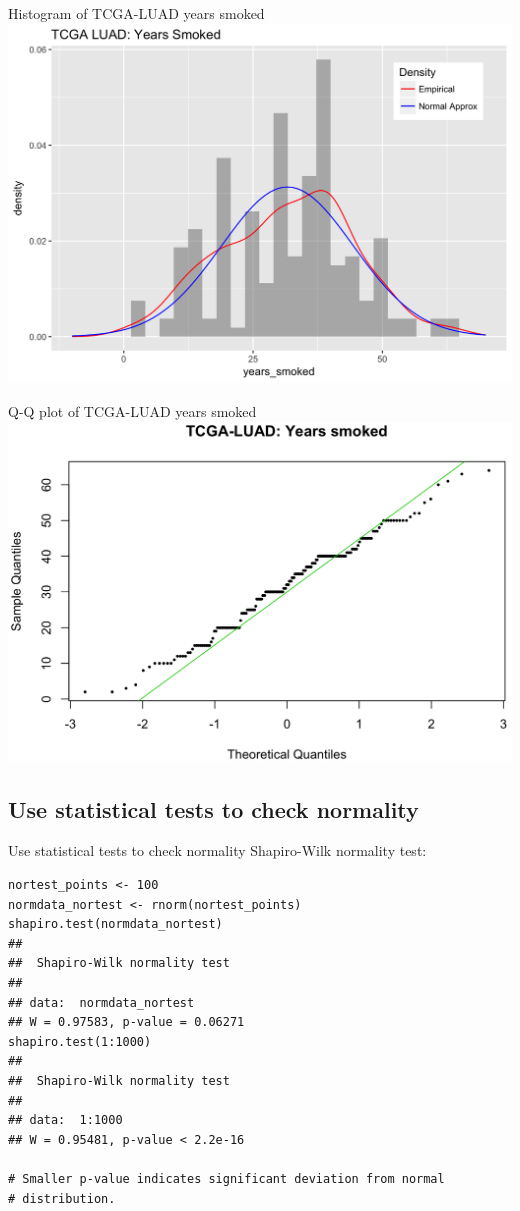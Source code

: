 \documentclass[12pt, t, xcolor=dvipsnames]{beamer}
\begin{document}
\begin{frame}{Histogram of TCGA-LUAD years smoked}
\includegraphics[width=\textwidth, keepaspectratio]{histys}
\end{frame}

\begin{frame}{Q-Q plot of TCGA-LUAD years smoked}
\includegraphics[width=\textwidth, keepaspectratio]{qqys}
\end{frame}

\subsection{Use statistical tests to check normality}

\begin{frame}[fragile]{Use statistical tests to check normality}
Shapiro-Wilk normality test:
\begin{verbatim}
nortest_points <- 100
normdata_nortest <- rnorm(nortest_points)
shapiro.test(normdata_nortest)
## 
##  Shapiro-Wilk normality test
## 
## data:  normdata_nortest
## W = 0.97583, p-value = 0.06271
shapiro.test(1:1000)
## 
##  Shapiro-Wilk normality test
## 
## data:  1:1000
## W = 0.95481, p-value < 2.2e-16

# Smaller p-value indicates significant deviation from normal 
# distribution. 
\end{verbatim}


\end{frame}
\end{document}
